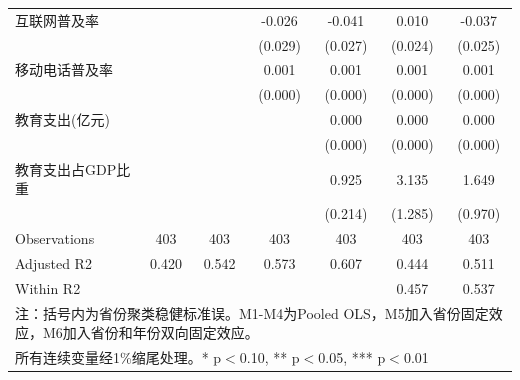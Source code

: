 \begin{table}[htbp]
\begin{tabular}{l*{6}{c}}
\addlinespace
互联网普及率        &                     &                     &      -0.026         &      -0.041         &       0.010         &      -0.037         \\
                    &                     &                     &     (0.029)         &     (0.027)         &     (0.024)         &     (0.025)         \\
\addlinespace
移动电话普及率      &                     &                     &       0.001\sym{***}&       0.001\sym{***}&       0.001\sym{***}&       0.001\sym{**} \\
                    &                     &                     &     (0.000)         &     (0.000)         &     (0.000)         &     (0.000)         \\
\addlinespace
教育支出(亿元)      &                     &                     &                     &       0.000         &       0.000         &       0.000         \\
                    &                     &                     &                     &     (0.000)         &     (0.000)         &     (0.000)         \\
\addlinespace
教育支出占GDP比重   &                     &                     &                     &       0.925\sym{***}&       3.135\sym{**} &       1.649\sym{*}  \\
                    &                     &                     &                     &     (0.214)         &     (1.285)         &     (0.970)         \\
\midrule
Observations        &         403         &         403         &         403         &         403         &         403         &         403         \\
Adjusted R2         &       0.420         &       0.542         &       0.573         &       0.607         &       0.444         &       0.511         \\
Within R2           &                     &                     &                     &                     &       0.457         &       0.537         \\
\bottomrule
\multicolumn{7}{l}{\footnotesize 注：括号内为省份聚类稳健标准误。M1-M4为Pooled OLS，M5加入省份固定效应，M6加入省份和年份双向固定效应。}\\
\multicolumn{7}{l}{\footnotesize 所有连续变量经1\%缩尾处理。* p$<$0.10, ** p$<$0.05, *** p$<$0.01}\\
\end{tabular}
\end{table}
